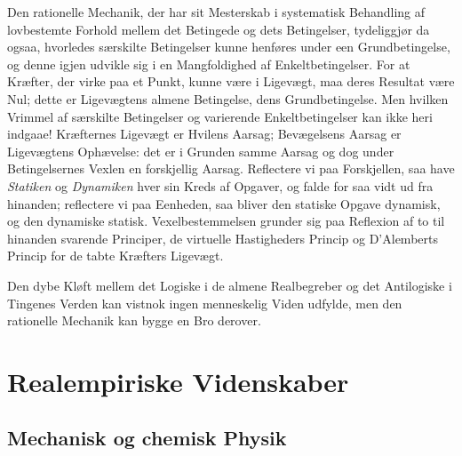 \documentclass[12pt]{book}
\newcommand{\apage}[1]{\marginnote{\footnotesize\textit{[#1]}}}
\begin{document}
Den rationelle Mechanik, der har sit Mesterskab i systematisk Behandling af
lovbestemte Forhold mellem det Betingede og dets Betingelser, tydeliggjør
da ogsaa, hvorledes særskilte Betingelser kunne henføres under een
Grundbetingelse, og denne igjen udvikle sig i en Mangfoldighed af
Enkeltbetingelser. For at Kræfter, der virke paa et Punkt, kunne være i
Ligevægt, maa deres Resultat være Nul; dette er Ligevægtens almene
Betingelse, dens Grundbetingelse. Men hvilken Vrimmel af særskilte
Betingelser og varierende Enkeltbetingelser kan ikke heri indgaae!
Kræfternes Ligevægt er Hvilens Aarsag; Bevægelsens Aarsag er Ligevægtens
Ophævelse: det er i Grunden samme Aarsag og dog under Betingelsernes Vexlen
en forskjellig Aarsag. Reflectere vi paa Forskjellen, saa have \emph{Statiken} og
\emph{Dynamiken} hver sin Kreds af Opgaver, og falde for saa vidt ud fra
hinanden; reflectere vi paa Eenheden, saa bliver den statiske Opgave
dynamisk, og den dynamiske statisk. Vexelbestemmelsen grunder sig paa
\apage{135} Reflexion af to til hinanden svarende Principer, de virtuelle Hastigheders
Princip og D'Alemberts Princip for de tabte Kræfters Ligevægt.

Den dybe Kløft mellem det Logiske i de almene Realbegreber og det
Antilogiske i Tingenes Verden kan vistnok ingen menneskelig Viden udfylde,
men den rationelle Mechanik kan bygge en Bro derover.


\chapter{Realempiriske Videnskaber}

\section{Mechanisk og chemisk Physik}
\label{sec:14}
\end{document}
